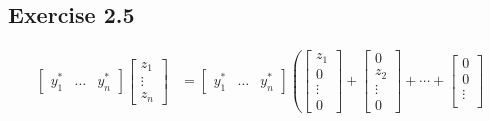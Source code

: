 \documentclass{article}
\begin{document}
\subsection*{Exercise 2.5}

\begin{align*}
  \begin{bmatrix}
    y_1^* & \ldots & y_n^*
  \end{bmatrix} \begin{bmatrix}
                  z_1    \\
                  \vdots \\
                  z_n
                \end{bmatrix} & = \begin{bmatrix}
                                    y_1^* & \ldots & y_n^*
                                  \end{bmatrix} \left( \begin{bmatrix}
                                                         z_1    \\
                                                         0      \\
                                                         \vdots \\
                                                         0
                                                       \end{bmatrix} + \begin{bmatrix}
                                                                         0      \\
                                                                         z_2    \\
                                                                         \vdots \\
                                                                         0
                                                                       \end{bmatrix} + \cdots + \begin{bmatrix}
                                                                                                  0      \\
                                                                                                  0      \\
                                                                                                  \vdots \\

\end{bmatrix}
\end{align*}
\end{document}
